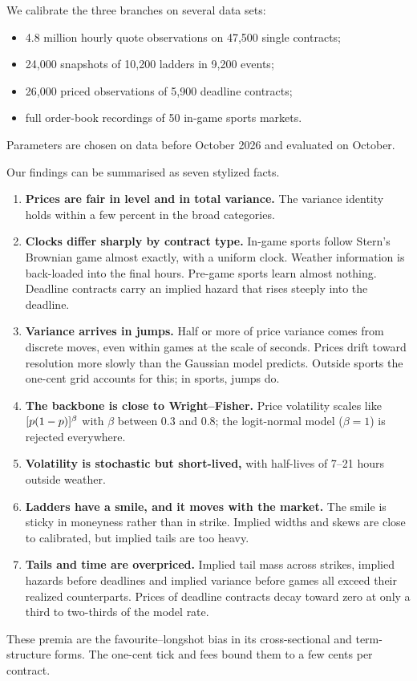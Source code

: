 We calibrate the three branches on several data sets:
\begin{itemize}
  \item 4.8 million hourly quote observations on 47,500 single contracts;
  \item 24,000 snapshots of 10,200 ladders in 9,200 events;
  \item 26,000 priced observations of 5,900 deadline contracts;
  \item full order-book recordings of 50 in-game sports markets.
\end{itemize}
Parameters are chosen on data before October 2026 and evaluated on October.

Our findings can be summarised as seven stylized facts.
\begin{enumerate}
  \item \textbf{Prices are fair in level and in total variance.} The variance identity holds within
  a few percent in the broad categories.
  \item \textbf{Clocks differ sharply by contract type.} In-game sports follow Stern's Brownian game
  almost exactly, with a uniform clock. Weather information is back-loaded into the final hours.
  Pre-game sports learn almost nothing. Deadline contracts carry an implied hazard that rises
  steeply into the deadline.
  \item \textbf{Variance arrives in jumps.} Half or more of price variance comes from discrete moves,
  even within games at the scale of seconds. Prices drift toward resolution more slowly than the
  Gaussian model predicts. Outside sports the one-cent grid accounts for this; in sports, jumps do.
  \item \textbf{The backbone is close to Wright--Fisher.} Price volatility scales like
  $[p(1-p)]^\beta$ with $\beta$ between 0.3 and 0.8; the logit-normal model ($\beta=1$) is
  rejected everywhere.
  \item \textbf{Volatility is stochastic but short-lived,} with half-lives of 7--21 hours outside weather.
  \item \textbf{Ladders have a smile, and it moves with the market.} The smile is sticky in moneyness
  rather than in strike. Implied widths and skews are close to calibrated, but implied tails are
  too heavy.
  \item \textbf{Tails and time are overpriced.} Implied tail mass across strikes, implied hazards
  before deadlines and implied variance before games all exceed their realized counterparts.
  Prices of deadline contracts decay toward zero at only a third to two-thirds of the model rate.
\end{enumerate}
These premia are the favourite--longshot bias in its cross-sectional and term-structure forms. The
one-cent tick and fees bound them to a few cents per contract.

